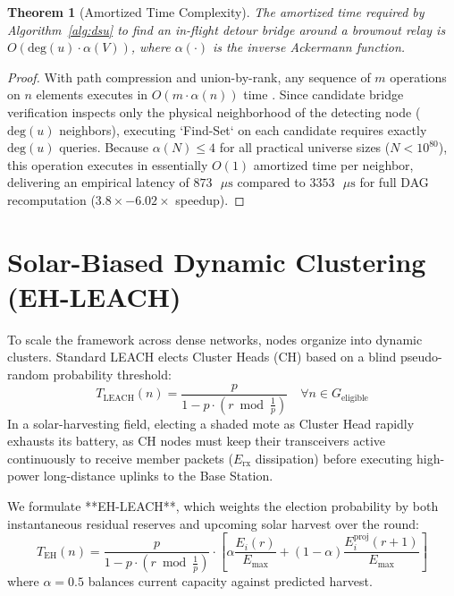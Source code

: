 \documentclass[journal]{IEEEtran}
\newtheorem{theorem}{Theorem}
\begin{document}
\begin{theorem}[Amortized Time Complexity]
The amortized time required by Algorithm~\ref{alg:dsu} to find an in-flight detour bridge around a brownout relay is $O(\text{deg}(u) \cdot \alpha(V))$, where $\alpha(\cdot)$ is the inverse Ackermann function.
\end{theorem}
\begin{proof}
With path compression and union-by-rank, any sequence of $m$ operations on $n$ elements executes in $O(m \cdot \alpha(n))$ time \cite{tarjan1975efficiency}. Since candidate bridge verification inspects only the physical neighborhood of the detecting node ($\text{deg}(u)$ neighbors), executing `Find-Set` on each candidate requires exactly $\text{deg}(u)$ queries. Because $\alpha(N) \le 4$ for all practical universe sizes ($N < 10^{80}$), this operation executes in essentially $O(1)$ amortized time per neighbor, delivering an empirical latency of $873\text{ }\mu\text{s}$ compared to $3353\text{ }\mu\text{s}$ for full DAG recomputation ($3.8\times - 6.02\times$ speedup).
\end{proof}

\section{Solar-Biased Dynamic Clustering (EH-LEACH)}
To scale the framework across dense networks, nodes organize into dynamic clusters. Standard LEACH elects Cluster Heads (CH) based on a blind pseudo-random probability threshold:
\begin{equation}
T_{\text{LEACH}}(n) = \frac{p}{1 - p \cdot \left( r \bmod \frac{1}{p} \right)} \quad \forall n \in G_{\text{eligible}}
\end{equation}
In a solar-harvesting field, electing a shaded mote as Cluster Head rapidly exhausts its battery, as CH nodes must keep their transceivers active continuously to receive member packets ($E_{\text{rx}}$ dissipation) before executing high-power long-distance uplinks to the Base Station.

We formulate **EH-LEACH**, which weights the election probability by both instantaneous residual reserves and upcoming solar harvest over the round:
\begin{equation}
T_{\text{EH}}(n) = \frac{p}{1 - p \cdot \left( r \bmod \frac{1}{p} \right)} \cdot \left[ \alpha \frac{E_i(r)}{E_{\max}} + (1 - \alpha) \frac{E_i^{\text{proj}}(r+1)}{E_{\max}} \right]
\label{eq:eh_leach}
\end{equation}
where $\alpha = 0.5$ balances current capacity against predicted harvest.
\end{document}

